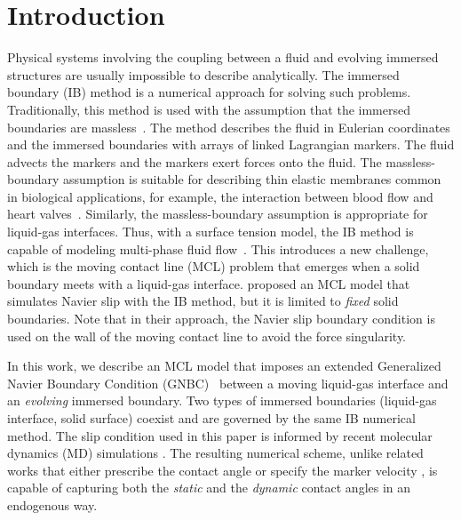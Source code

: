 \documentclass[%
 aip,
 amsmath,amssymb,
 reprint,
 floatfix
]{revtex4-1}
\begin{document}
\section{Introduction}
Physical systems involving the coupling between a fluid and evolving immersed structures are usually impossible to describe analytically. The immersed boundary (IB) method is a numerical approach for solving such problems.  Traditionally, this method is used with the assumption that the immersed boundaries are massless~\cite{peskin1972flow}. The method describes the fluid in Eulerian coordinates and the immersed boundaries with arrays of linked Lagrangian markers. The fluid advects the markers and the markers exert forces onto the fluid. The massless-boundary assumption is suitable for describing thin elastic membranes common in biological applications, for example, the interaction between blood flow and heart valves~\cite{peskin1972flow}. Similarly, the massless-boundary assumption is appropriate for liquid-gas interfaces. Thus, with a surface tension model, the IB method is capable of modeling multi-phase fluid flow~\cite{leveque1997immersed, lorstad2004assessment, popinet2018numerical,  huang2018improved}. This introduces a new challenge, which is the moving contact line (MCL) problem that emerges when a solid boundary meets with a liquid-gas interface. \citet{lai2010numerical} proposed an MCL model that simulates Navier slip with the IB method, but it is limited to \textit{fixed} solid boundaries. Note that in their approach, the Navier slip boundary condition is used on the wall of the moving contact line to avoid the force singularity. 


In this work, we describe an MCL model that imposes an extended Generalized Navier Boundary Condition (GNBC)~\cite{quian2003generalized} between a moving liquid-gas interface and an \textit{evolving} immersed boundary. Two types of immersed boundaries (liquid-gas interface, solid surface) coexist and are governed by the same IB numerical method. The slip condition used in this paper is informed by recent molecular dynamics (MD) simulations \cite{johansson2018molecular}. The resulting numerical scheme, unlike related works that either prescribe the contact angle \cite{muradoglu2010front,liu2015diffuse} or specify the marker velocity \cite{manservisi2009variational}, is capable of capturing both the \textit{static} and the \textit{dynamic} contact angles in an endogenous way. 
\end{document}
